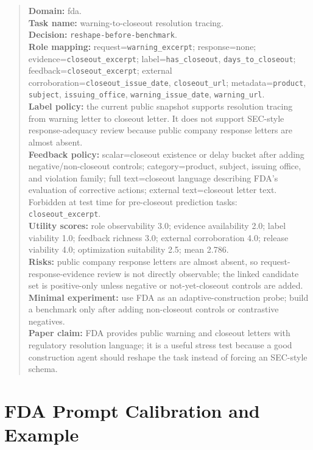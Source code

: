 \documentclass[11pt]{article}
\begin{document}
\begin{quote}\small
\textbf{Domain:} fda. \\
\textbf{Task name:} warning-to-closeout resolution tracing. \\
\textbf{Decision:} \texttt{reshape-before-benchmark}. \\
\textbf{Role mapping:} request=\texttt{warning\_excerpt}; response=none; evidence=\texttt{closeout\_excerpt}; label=\texttt{has\_closeout}, \texttt{days\_to\_closeout}; feedback=\texttt{closeout\_excerpt}; external corroboration=\texttt{closeout\_issue\_date}, \texttt{closeout\_url}; metadata=\texttt{product}, \texttt{subject}, \texttt{issuing\_office}, \texttt{warning\_issue\_date}, \texttt{warning\_url}. \\
\textbf{Label policy:} the current public snapshot supports resolution tracing from warning letter to closeout letter. It does not support SEC-style response-adequacy review because public company response letters are almost absent. \\
\textbf{Feedback policy:} scalar=closeout existence or delay bucket after adding negative/non-closeout controls; category=product, subject, issuing office, and violation family; full text=closeout language describing FDA's evaluation of corrective actions; external text=closeout letter text. Forbidden at test time for pre-closeout prediction tasks: \texttt{closeout\_excerpt}. \\
\textbf{Utility scores:} role observability 3.0; evidence availability 2.0; label viability 1.0; feedback richness 3.0; external corroboration 4.0; release viability 4.0; optimization suitability 2.5; mean 2.786. \\
\textbf{Risks:} public company response letters are almost absent, so request-response-evidence review is not directly observable; the linked candidate set is positive-only unless negative or not-yet-closeout controls are added. \\
\textbf{Minimal experiment:} use FDA as an adaptive-construction probe; build a benchmark only after adding non-closeout controls or contrastive negatives. \\
\textbf{Paper claim:} FDA provides public warning and closeout letters with regulatory resolution language; it is a useful stress test because a good construction agent should reshape the task instead of forcing an SEC-style schema.
\end{quote}

\section{FDA Prompt Calibration and Example}
\label{app:fda_prompt}
\end{document}
